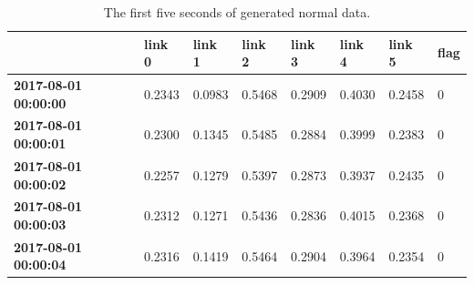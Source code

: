 \documentclass[5p]{elsarticle}
\begin{document}
\begin{table}[htbp]
\centering
\caption{The first five seconds of generated normal data.}
\label{table:first5s}
\resizebox{\linewidth}{!} {%
\begin{tabular}{@{}llllllll@{}}
\toprule
                             & \textbf{link 0} & \textbf{link 1} & \textbf{link 2} & \textbf{link 3} & \textbf{link 4} & \textbf{link 5} & \textbf{flag} \\ \midrule
\textbf{2017-08-01 00:00:00} & 0.2343          & 0.0983          & 0.5468          & 0.2909          & 0.4030          & 0.2458          & 0             \\
\textbf{2017-08-01 00:00:01} & 0.2300          & 0.1345          & 0.5485          & 0.2884          & 0.3999          & 0.2383          & 0             \\
\textbf{2017-08-01 00:00:02} & 0.2257          & 0.1279          & 0.5397          & 0.2873          & 0.3937          & 0.2435          & 0             \\
\textbf{2017-08-01 00:00:03} & 0.2312          & 0.1271          & 0.5436          & 0.2836          & 0.4015          & 0.2368          & 0             \\
\textbf{2017-08-01 00:00:04} & 0.2316          & 0.1419          & 0.5464          & 0.2904          & 0.3964          & 0.2354          & 0             \\ \bottomrule
\end{tabular}%
}
\end{table}


\begin{table}[htbp]
\centering
\caption{The time period and features affected for each anomaly generated by the simulated data. Feature numbers were listed in descending order of significance towards the data.}
\label{table:aintervals}
\end{table}
\end{document}
